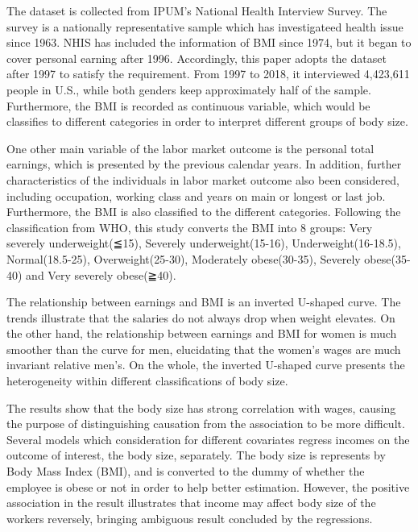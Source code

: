 \documentclass{article}
\begin{document}
\par
\setlength{\parindent}{2em}
The dataset is collected from IPUM’s National Health Interview Survey. The survey is a nationally representative sample which has investigateed health issue since 1963. NHIS has included the information of BMI since 1974, but it began to cover personal earning after 1996. Accordingly, this paper adopts the dataset after 1997 to satisfy the requirement. From 1997 to 2018, it interviewed 4,423,611 people in U.S., while both genders keep approximately half of the sample. Furthermore, the BMI is recorded as continuous variable, which would be classifies to different categories in order to interpret different groups of body size. 	
\par
\setlength{\parindent}{2em}
One other main variable of the labor market outcome is the personal total earnings, which is presented by the previous calendar years. In addition, further characteristics of the individuals in labor market outcome also been considered, including occupation, working class and years on main or longest or last job. Furthermore, the BMI is also classified to the different categories. Following the classification from WHO, this study converts the BMI into 8 groups: Very severely underweight(≦15), Severely underweight(15-16), Underweight(16-18.5), Normal(18.5-25), Overweight(25-30), Moderately obese(30-35), Severely obese(35-40) and Very severely obese(≧40).
\par
\setlength{\parindent}{2em}
The relationship between earnings and BMI is an inverted U-shaped curve. The trends illustrate that the salaries do not always drop when weight elevates. On the other hand, the relationship between earnings and BMI for women is much smoother than the curve for men, elucidating that the women’s wages are much invariant relative men’s. On the whole, the inverted U-shaped curve presents the heterogeneity within different classifications of body size.
\par
\setlength{\parindent}{2em}
The results show that the body size has strong correlation with wages, causing the purpose of distinguishing causation from the association to be more difficult. Several models which consideration for different covariates regress incomes on the outcome of interest, the body size, separately. The body size is represents by Body Mass Index (BMI), and is converted to the dummy of whether the employee is obese or not in order to help better estimation. However, the positive association in the result illustrates that income may affect body size of the workers reversely, bringing ambiguous result concluded by the regressions. 
\end{document}

